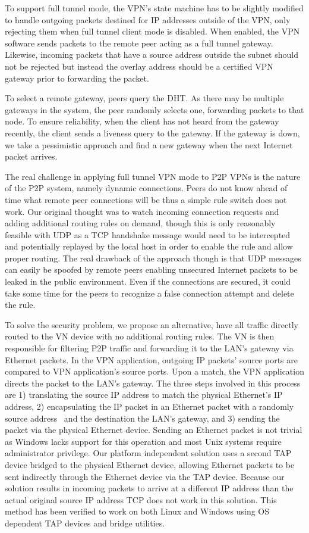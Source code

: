 To support full tunnel mode, the VPN's state machine has to be slightly modified
to handle outgoing packets destined for IP addresses outside of the VPN, only
rejecting them when full tunnel client mode is disabled.  When enabled, the VPN
software sends packets to the remote peer acting as a full tunnel gateway.
Likewise, incoming packets that have a source address outside the subnet should
not be rejected but instead the overlay address should be a certified VPN
gateway prior to forwarding the packet.

To select a remote gateway, peers query the DHT.  As there may be multiple
gateways in the system, the peer randomly selects one, forwarding packets to
that node.  To ensure reliability, when the client has not heard from the
gateway recently, the client sends a liveness query to the gateway.  If the
gateway is down, we take a pessimistic approach and find a new gateway when
the next Internet packet arrives.

The real challenge in applying full tunnel VPN mode to P2P VPNs is the nature
of the P2P system, namely dynamic connections.  Peers do not know ahead of time
what remote peer connections will be thus a simple rule switch does not work.
Our original thought was to watch incoming connection requests and adding
additional routing rules on demand, though this is only reasonably feasible
with UDP as a TCP handshake message would need to be intercepted and potentially
replayed by the local host in order to enable the rule and allow proper routing.
The real drawback of the approach though is that UDP messages can easily be
spoofed by remote peers enabling unsecured Internet packets to be leaked in the
public environment.  Even if the connections are secured, it could take some
time for the peers to recognize a false connection attempt and delete the rule.

To solve the security problem, we propose an alternative, have all traffic
directly routed to the VN device with no additional routing rules.  The VN is
then responsible for filtering P2P traffic and forwarding it to the LAN's
gateway via Ethernet packets.  In the VPN application, outgoing IP packets'
source ports are compared to VPN application's source ports.  Upon a match,
the VPN application directs the packet to the LAN's gateway.  The three steps
involved in this process are 1) translating the source IP address to match the
physical Ethernet's IP address, 2) encapsulating the IP packet in an Ethernet
packet with a randomly source address~\cite{sc09} and the destination the
LAN's gateway, and 3) sending the packet via the physical Ethernet device.
Sending an Ethernet packet is not trivial as Windows lacks support for this
operation and most Unix systems require administrator privilege.  Our platform
independent solution uses a second TAP device bridged to the physical Ethernet
device, allowing Ethernet packets to be sent indirectly through the Ethernet
device via the TAP device.  Because our solution results in incoming packets to
arrive at a different IP address than the actual original source IP address TCP
does not work in this solution.  This method has been verified to work on both
Linux and Windows using OS dependent TAP devices and bridge utilities.


